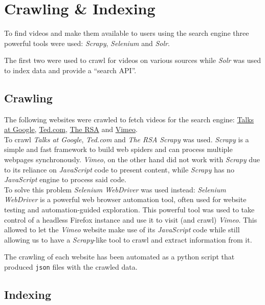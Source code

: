 \documentclass[12pt,numbers=enddot]{exam}
\begin{document}
\newpage

\section{Crawling \& Indexing}

To find videos and make them available to users using the search engine
three powerful tools were used: \textit{Scrapy}, \textit{Selenium}
and \textit{Solr}.

The first two were used to crawl for videos on various sources while
\textit{Solr} was used to index data and provide a ``search API''.

\subsection{Crawling}

The following websites were crawled to fetch videos for the search
engine: \href{https://talksat.withgoogle.com}{Talks at Google},
\href{https://www.ted.com}{Ted.com}, \href{https://www.thersa.org}{The RSA} and
\href{https://vimeo.com}{Vimeo}. \\

To crawl \textit{Talks at Google}, \textit{Ted.com} and \textit{The RSA}
\textit{Scrapy} was used. \textit{Scrapy} is a simple and fast framework to
build web spiders and can process multiple webpages synchronously.
\textit{Vimeo}, on the other hand did not work with \textit{Scrapy} due to its
reliance on \textit{JavaScript} code to present content, while \textit{Scrapy}
has no \textit{JavaScript} engine to process said code. \\

To solve this problem \textit{Selenium WebDriver} was used instead:
\textit{Selenium WebDriver} is a powerful web browser automation tool,
often used for website testing and automation-guided exploration. This powerful
tool was used to take control of a headless Firefox instance and use it to
visit (and crawl) \textit{Vimeo}. This allowed to let the \textit{Vimeo}
website make use of its \textit{JavaScript} code while still allowing us to
have a \textit{Scrapy}-like tool to crawl and extract information from it.

The crawling of each website has been automated as a python script that
produced \texttt{json} files with the crawled data.

\subsection{Indexing}
\end{document}
